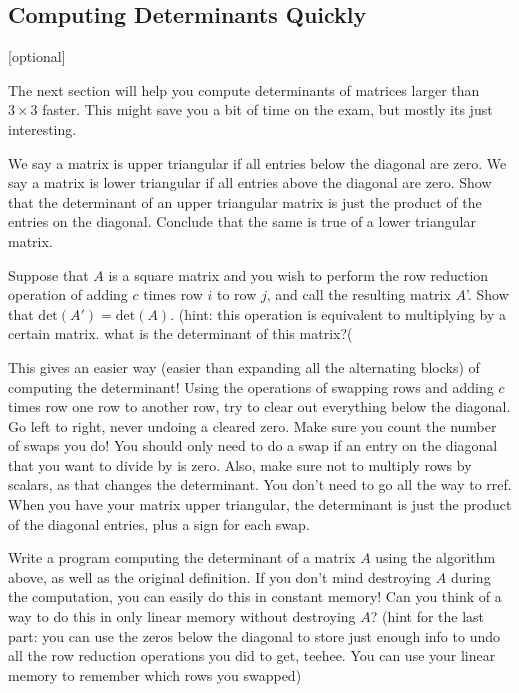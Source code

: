 \subsection{Computing Determinants Quickly}[optional]

The next section will help you compute determinants of matrices larger than $3\times 3$ faster.
This might save you a bit of time on the exam, but mostly its just interesting.

\begin{Ex}
  \label{sec:uppertridet}
  We say a matrix is upper triangular if all entries below the diagonal are zero.
  We say a matrix is lower triangular if all entries above the diagonal are zero.
  Show that the determinant of an upper triangular matrix is just the product of the entries on the diagonal.
  Conclude that the same is true of a lower triangular matrix.
\end{Ex}

\begin{Ex}
  \label{sec:gauselimdet}
  Suppose that $A$ is a square matrix and you wish to perform the row reduction operation of adding $c$ times row $i$ to row $j$, and call the resulting matrix $A$'.
  Show that $\mbox{det}(A')=\mbox{det}(A)$.  
  (hint: this operation is equivalent to multiplying by a certain matrix.  what is the determinant of this matrix?(
\end{Ex}

This gives an easier way (easier than expanding all the alternating blocks) of computing the determinant!
Using the operations of swapping rows and adding $c$ times row one row to another row, try to clear out everything below the diagonal.
Go left to right, never undoing a cleared zero.  
Make sure you count the number of swaps you do!  You should only need to do a swap if an entry on the diagonal that you want to divide by is zero.
Also, make sure not to multiply rows by scalars, as that changes the determinant. 
You don't need to go all the way to rref.
When you have your matrix upper triangular, the determinant is just the product of the diagonal entries, plus a sign for each swap.  

\begin{ExProg}
  Write a program computing the determinant of a matrix $A$ using the algorithm above, as well as the original definition.
  If you don't mind destroying $A$ during the computation, you can easily do this in constant memory!
  Can you think of a way to do this in only linear memory without destroying $A$?
  (hint for the last part: you can use the zeros below the diagonal to store just enough info to undo all the row reduction operations you did to get, teehee.  
  You can use your linear memory to remember which rows you swapped)
\end{ExProg}

